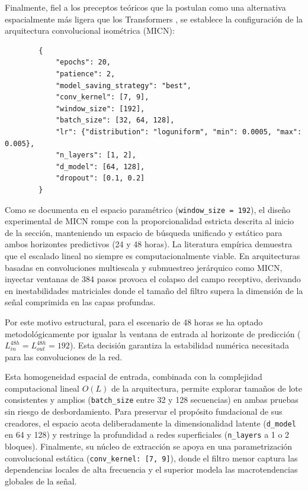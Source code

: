 Finalmente, fiel a los preceptos teóricos que la postulan como una alternativa espacialmente más ligera que los Transformers \parencite{wang2023micn}, se establece la configuración de la arquitectura convolucional isométrica (MICN):

\begin{listing}[H]
	\caption{Espacio de búsqueda y configuración base para la arquitectura MICN.}
	\label{lst:json_micn}
	\begin{verbatim}
		{
			"epochs": 20,
			"patience": 2,
			"model_saving_strategy": "best",
			"conv_kernel": [7, 9],
			"window_size": [192],
			"batch_size": [32, 64, 128],
			"lr": {"distribution": "loguniform", "min": 0.0005, "max": 0.005},
			"n_layers": [1, 2],
			"d_model": [64, 128],
			"dropout": [0.1, 0.2]
		}
	\end{verbatim}
\end{listing}

Como se documenta en el espacio paramétrico (\texttt{window\_size = 192}), el diseño experimental de MICN rompe con la proporcionalidad estricta descrita al inicio de la sección, manteniendo un espacio de búsqueda unificado y estático para ambos horizontes predictivos (24 y 48 horas). La literatura empírica demuestra que el escalado lineal no siempre es computacionalmente viable. En arquitecturas basadas en convoluciones multiescala y submuestreo jerárquico como MICN, inyectar ventanas de 384 pasos provoca el colapso del campo receptivo, derivando en inestabilidades matriciales donde el tamaño del filtro supera la dimensión de la señal comprimida en las capas profundas.

Por este motivo estructural, para el escenario de 48 horas se ha optado metodológicamente por igualar la ventana de entrada al horizonte de predicción ($L_{in}^{48h} = L_{out}^{48h} = 192$). Esta decisión garantiza la estabilidad numérica necesitada para las convoluciones de la red.

Esta homogeneidad espacial de entrada, combinada con la complejidad computacional lineal $O(L)$ de la arquitectura, permite explorar tamaños de lote consistentes y amplios (\texttt{batch\_size} entre 32 y 128 secuencias) en ambas pruebas sin riesgo de desbordamiento. Para preservar el propósito fundacional de sus creadores, el espacio acota deliberadamente la dimensionalidad latente (\texttt{d\_model} en 64 y 128) y restringe la profundidad a redes superficiales (\texttt{n\_layers} a 1 o 2 bloques). Finalmente, su núcleo de extracción se apoya en una parametrización convolucional estática (\texttt{conv\_kernel: [7, 9]}), donde el filtro menor captura las dependencias locales de alta frecuencia y el superior modela las macrotendencias globales de la señal.


